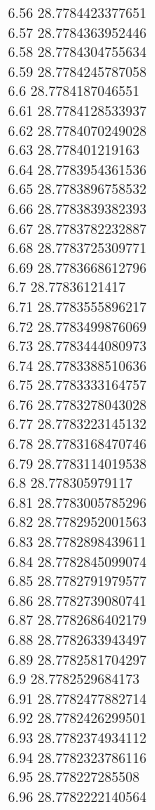 {6.56	28.7784423377651\\
6.57	28.7784363952446\\
6.58	28.7784304755634\\
6.59	28.7784245787058\\
6.6	28.7784187046551\\
6.61	28.7784128533937\\
6.62	28.7784070249028\\
6.63	28.778401219163\\
6.64	28.7783954361536\\
6.65	28.7783896758532\\
6.66	28.7783839382393\\
6.67	28.7783782232887\\
6.68	28.7783725309771\\
6.69	28.7783668612796\\
6.7	28.77836121417\\
6.71	28.7783555896217\\
6.72	28.7783499876069\\
6.73	28.7783444080973\\
6.74	28.7783388510636\\
6.75	28.7783333164757\\
6.76	28.7783278043028\\
6.77	28.7783223145132\\
6.78	28.7783168470746\\
6.79	28.7783114019538\\
6.8	28.778305979117\\
6.81	28.7783005785296\\
6.82	28.7782952001563\\
6.83	28.7782898439611\\
6.84	28.7782845099074\\
6.85	28.7782791979577\\
6.86	28.7782739080741\\
6.87	28.7782686402179\\
6.88	28.7782633943497\\
6.89	28.7782581704297\\
6.9	28.7782529684173\\
6.91	28.7782477882714\\
6.92	28.7782426299501\\
6.93	28.7782374934112\\
6.94	28.7782323786116\\
6.95	28.778227285508\\
6.96	28.7782222140564\\
}
